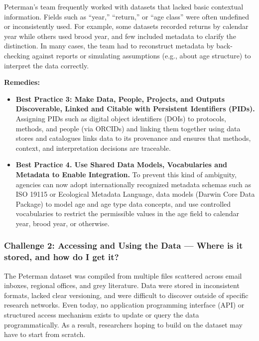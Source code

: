\documentclass[
  letterpaper,
  DIV=11,
  numbers=noendperiod]{scrartcl}
\begin{document}
Peterman's team frequently worked with datasets that lacked basic
contextual information. Fields such as ``year,'' ``return,'' or ``age
class'' were often undefined or inconsistently used. For example, some
datasets recorded returns by calendar year while others used brood year,
and few included metadata to clarify the distinction. In many cases, the
team had to reconstruct metadata by back-checking against reports or
simulating assumptions (e.g., about age structure) to interpret the data
correctly.

\textbf{Remedies:}

\begin{itemize}
\item
  \textbf{Best Practice 3: Make Data, People, Projects, and Outputs
  Discoverable, Linked and Citable with Persistent Identifiers (PIDs).}
  Assigning PIDs such as digital object identifiers (DOIs) to protocols,
  methods, and people (via ORCIDs) and linking them together using data
  stores and catalogues links data to its provenance and ensures that
  methods, context, and interpretation decisions are traceable.
\item
  \textbf{Best Practice 4. Use Shared Data Models, Vocabularies and
  Metadata to Enable Integration.} To prevent this kind of ambiguity,
  agencies can now adopt internationally recognized metadata schemas
  such as ISO 19115 or Ecological Metadata Language, data models (Darwin
  Core Data Package) to model age and age type data concepts, and use
  controlled vocabularies to restrict the permissible values in the age
  field to calendar year, brood year, or otherwise.
\end{itemize}

\subsubsection{Challenge 2: Accessing and Using the Data --- Where is it
stored, and how do I get
it?}\label{challenge-2-accessing-and-using-the-data-where-is-it-stored-and-how-do-i-get-it}

The Peterman dataset was compiled from multiple files scattered across
email inboxes, regional offices, and grey literature. Data were stored
in inconsistent formats, lacked clear versioning, and were difficult to
discover outside of specific research networks. Even today, no
application programming interface (API) or structured access mechanism
exists to update or query the data programmatically. As a result,
researchers hoping to build on the dataset may have to start from
scratch.
\end{document}
